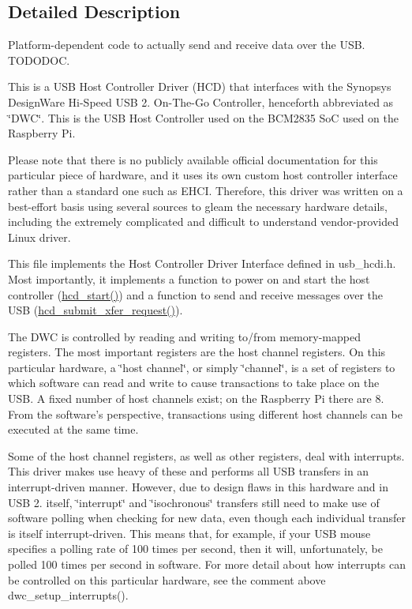 \subsection{Detailed Description}
Platform-\/dependent code to actually send and receive data over the U\-S\-B. T\-O\-D\-O\-D\-O\-C.

This is a U\-S\-B Host Controller Driver (H\-C\-D) that interfaces with the Synopsys Design\-Ware Hi-\/\-Speed U\-S\-B 2. On-\/\-The-\/\-Go Controller, henceforth abbreviated as \char`\"{}\-D\-W\-C\char`\"{}. This is the U\-S\-B Host Controller used on the B\-C\-M2835 So\-C used on the Raspberry Pi.

Please note that there is no publicly available official documentation for this particular piece of hardware, and it uses its own custom host controller interface rather than a standard one such as E\-H\-C\-I. Therefore, this driver was written on a best-\/effort basis using several sources to gleam the necessary hardware details, including the extremely complicated and difficult to understand vendor-\/provided Linux driver.

This file implements the Host Controller Driver Interface defined in usb\-\_\-hcdi.\-h. Most importantly, it implements a function to power on and start the host controller (\hyperlink{group__usbhcd_gaab6ab94dcc19ea7a80aed9af1c44ab7d}{hcd\-\_\-start()}) and a function to send and receive messages over the U\-S\-B (\hyperlink{group__usbhcd_ga72b7448515ed0c92480cb6737009e626}{hcd\-\_\-submit\-\_\-xfer\-\_\-request()}).

The D\-W\-C is controlled by reading and writing to/from memory-\/mapped registers. The most important registers are the host channel registers. On this particular hardware, a \char`\"{}host channel\char`\"{}, or simply \char`\"{}channel\char`\"{}, is a set of registers to which software can read and write to cause transactions to take place on the U\-S\-B. A fixed number of host channels exist; on the Raspberry Pi there are 8. From the software's perspective, transactions using different host channels can be executed at the same time.

Some of the host channel registers, as well as other registers, deal with interrupts. This driver makes use heavy of these and performs all U\-S\-B transfers in an interrupt-\/driven manner. However, due to design flaws in this hardware and in U\-S\-B 2. itself, \char`\"{}interrupt\char`\"{} and \char`\"{}isochronous\char`\"{} transfers still need to make use of software polling when checking for new data, even though each individual transfer is itself interrupt-\/driven. This means that, for example, if your U\-S\-B mouse specifies a polling rate of 100 times per second, then it will, unfortunately, be polled 100 times per second in software. For more detail about how interrupts can be controlled on this particular hardware, see the comment above dwc\-\_\-setup\-\_\-interrupts().

